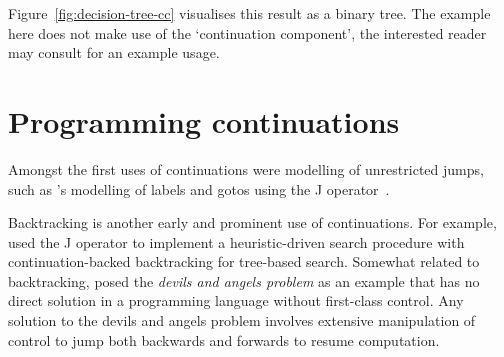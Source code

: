 \documentclass[12pt,phd,lfcs,twoside,openright,logo,leftchapter,normalheadings]{infthesis}
\theoremstyle{plain}
\theoremstyle{definition}
\begin{document}
%
Figure~\ref{fig:decision-tree-cc} visualises this result as a binary
tree. The example here does not make use of the `continuation
component', the interested reader may consult \citet{LongleyW08} for
an example usage.



\section{Programming continuations}
\label{sec:programming-continuations}

Amongst the first uses of continuations were modelling of unrestricted
jumps, such as \citeauthor{Landin98}'s modelling of \Algol{} labels
and gotos using the J
operator~\cite{Landin65,Landin65a,Landin98,Reynolds93}.

Backtracking is another early and prominent use of continuations. For
example, \citet{Burstall69} used the J operator to implement a
heuristic-driven search procedure with continuation-backed
backtracking for tree-based search.
%
Somewhat related to backtracking, \citet{FriedmanHK84} posed the
\emph{devils and angels problem} as an example that has no direct
solution in a programming language without first-class control. Any
solution to the devils and angels problem involves extensive
manipulation of control to jump both backwards and forwards to resume
computation.
\end{document}
